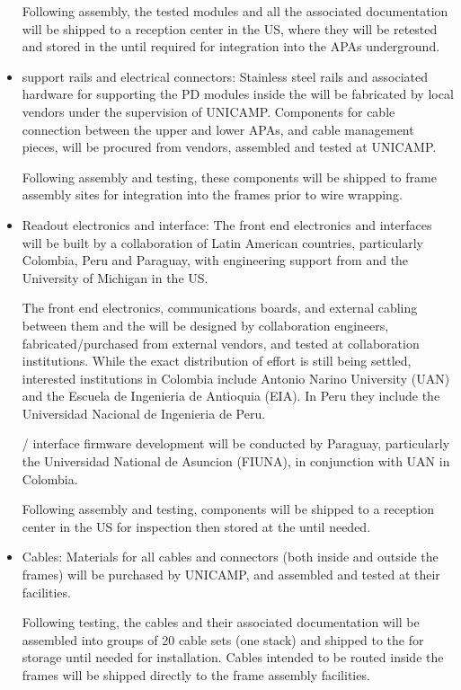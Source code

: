 \begin{itemize}
Following assembly, the tested modules and all the associated  documentation will be shipped to a reception center in the US, where they will be retested and stored in the until required for integration into the APAs underground.

\item {} support rails and electrical connectors:  Stainless steel rails and associated hardware for supporting the PD modules inside the  will be fabricated by local vendors under the supervision of UNICAMP.  Components for cable connection between the upper and lower APAs, and cable management pieces, will be procured from vendors, assembled and tested at UNICAMP.  

Following assembly and testing, these components will be shipped to  frame assembly sites for integration into the frames prior to wire wrapping.

\item Readout electronics and  interface:  The front end electronics and  interfaces will be built by a collaboration of Latin American countries, particularly Colombia, Peru and Paraguay, with engineering support from  and the University of Michigan in the US. 

The front end electronics, communications boards, and external cabling between them and the  will be designed by collaboration engineers, fabricated/purchased from external vendors, and tested at collaboration institutions.  While the exact distribution of effort is still being settled, interested institutions in Colombia include Antonio Narino University (UAN) and the Escuela de Ingenieria de Antioquia (EIA).  In Peru they include the Universidad Nacional de Ingenieria de Peru.

/ interface firmware development will be conducted by Paraguay, particularly the Universidad National de Asuncion (FIUNA), in conjunction with UAN in Colombia.

Following assembly and testing, components will be shipped to a reception center in the US for inspection then stored at the  until needed.

\item Cables:  Materials for all cables and connectors (both inside and outside the  frames) will be purchased by UNICAMP, and assembled and tested at their facilities.

Following testing, the cables and their associated  documentation will be assembled into groups of 20 cable sets (one  stack) and shipped to the  for storage until needed for installation.  Cables intended to be routed inside the  frames will be shipped directly to the  frame assembly facilities.


\end{itemize}
